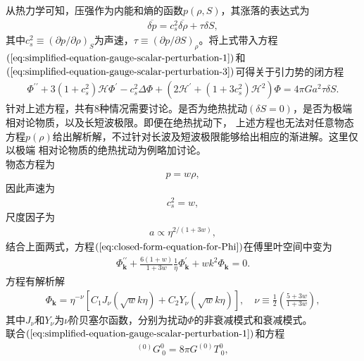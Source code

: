 从热力学可知，压强作为内能和熵的函数$p(\rho, S)$，其涨落的表达式为
\begin{align}
  \label{eq:perturbation-of-pressure}
  \overline{\delta
  p}=c^2_{s}\overline{\delta\rho}+\tau\delta S,
\end{align}
其中$c^2_{s}\equiv {\left(\partial p /\partial
\rho\right)}_{S}$为声速，$\tau\equiv{\left(\partial p /\partial
S\right)}_{\rho}$。将上式带入方程$(\ref{eq:simplified-equation-gauge-scalar-perturbation-1})$和$(\ref{eq:simplified-equation-gauge-scalar-perturbation-3})$可得关于引力势的闭方程
\begin{align}
  \label{eq:closed-form-equation-for-Phi}
  \Phi^{\prime\prime}+3{\left(1+c^2_{s}\right)}\mathcal{H}\Phi^\prime-c^2_{s}\Delta\Phi+{\left(2\mathcal{H}^{\prime}+
  {\left(1+3c^2_{s}\right)}\mathcal{H}^2\right)}\Phi=4\pi Ga^2\tau\delta S.
\end{align}
针对上述方程，共有8种情况需要讨论。是否为绝热扰动${\left(\delta
S=0\right)}$，是否为极端相对论物质，以及长短波极限。即便在绝热扰动下，
上述方程也无法对任意物态方程$p(\rho)$给出解析解，不过针对长波及短波极限能够给出相应的渐进解。这里仅以极端
相对论物质的绝热扰动为例略加讨论。
\\
物态方程为
\begin{align}
  p=w\rho,
\end{align}
因此声速为
\begin{align}
  c^2_{s}=w,
\end{align}
尺度因子为
\begin{align}
  a\propto\eta^{2 /(1+3w)},
\end{align}
结合上面两式，方程$(\ref{eq:closed-form-equation-for-Phi})$在傅里叶空间中变为
\begin{align}
  \label{eq:adiabatic-relativistic-equation-of-Phi}
  \Phi^{\prime\prime}_{\mathbf{k}}+\frac{6(1+w)}{1+3w}\frac{1}{\eta}\Phi^\prime_{\mathbf{k}}+wk^2\Phi_{\mathbf{k}}=0.
\end{align}
方程有解析解
\begin{align}
  \label{eq:solution-for-adiabatic-relativistic-equation-of-Phi}
  \Phi_{\mathbf{k}}=\eta^{-\nu}{\left[
  C_1J_{\nu}{\left(\sqrt{w}k\eta\right)}+C_2Y_{\nu}{\left(\sqrt{w}k\eta\right)}
  \right]},\quad
  \nu\equiv \frac{1}{2}{\left(\frac{5+3w}{1+3w}\right)},
\end{align}
其中$J_{\nu}$和$Y_{\nu}$为$\nu$阶贝塞尔函数，分别为扰动$\Phi$的非衰减模式和衰减模式。\\
联合$(\ref{eq:simplified-equation-gauge-scalar-perturbation-1})$和方程
\begin{align}
  ^{(0)}G^{0}_{~0} =8\pi G ^{(0)}T^{0}_{~0}, 
\end{align}
